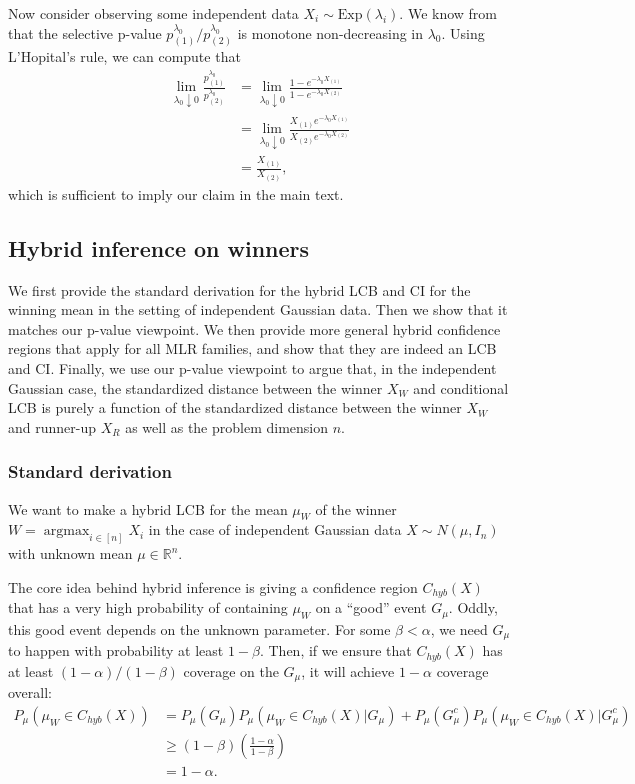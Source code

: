 \documentclass{article}
\DeclareMathOperator*{\argmax}{argmax}
\newcommand{\R}{\mathbb{R}}
\begin{document}
\begin{appendix}
Now consider observing some independent data $X_i \sim \text{Exp}(\lambda_i)$. We know from  that the selective p-value $p^{\lambda_0}_{(1)}/p^{\lambda_0}_{(2)}$ is monotone non-decreasing in $\lambda_0$. Using L'Hopital's rule, we can compute that 
\begin{align*}
    \lim_{\lambda_0 \downarrow 0} \frac{p^{\lambda_0}_{(1)}}{p^{\lambda_0}_{(2)}} &=  \lim_{\lambda_0 \downarrow 0}  \frac{1 - e^{-\lambda_0 X_{(1)}} }{1 - e^{-\lambda_0 X_{(2)}}}\\
    &= \lim_{\lambda_0 \downarrow 0} \frac{X_{(1)}e^{-\lambda_0 X_{(1)}}}{X_{(2)}e^{-\lambda_0 X_{(2)}}}\\
    &= \frac{X_{(1)}}{X_{(2)}},
\end{align*}
which is sufficient to imply our claim in the main text.  

\subsection{Hybrid inference on winners}
\label{sec:hybrid_appdx}

We first provide the standard derivation for the hybrid LCB and CI for the winning mean in the setting of independent Gaussian data. Then we show that it matches our p-value viewpoint. We then provide more general hybrid confidence regions that apply for all MLR families, and show that they are indeed an LCB and CI. Finally, we use our p-value viewpoint to argue that, in the independent Gaussian case, the standardized distance between the winner $X_W$ and conditional LCB is purely a function of the standardized distance between the winner $X_W$ and runner-up $X_R$ as well as the problem dimension $n$. 

\subsubsection{Standard derivation}

We want to make a hybrid LCB for the mean $\mu_{W}$ of the winner $W = \argmax_{i \in [n]} X_i$ in the case of independent Gaussian data $X \sim N(\mu, I_n)$ with unknown mean $\mu \in \R^n$. 

The core idea behind hybrid inference is giving a confidence region $C_{hyb}(X)$ that has a very high probability of containing $\mu_W$ on a ``good'' event $G_{\mu}$. Oddly, this good event depends on the unknown parameter. For some $\beta < \alpha$, we need $G_{\mu}$ to happen with probability at least $1-\beta$. Then, if we ensure that $C_{hyb}(X)$ has at least $(1-\alpha)/(1-\beta)$ coverage on the $G_{\mu}$, it will achieve $1-\alpha$ coverage overall:
\begin{align*}
       P_{\mu}(\mu_{W} \in C_{hyb}(X)) &= P_{\mu}(G_{\mu})P_{\mu}(\mu_{W} \in C_{hyb}(X) | G_{\mu}) + P_{\mu}(G_{\mu}^c)P_{\mu}(\mu_{W} \in C_{hyb}(X) | G_{\mu}^c)\\
       &\geq (1-\beta)\left(\frac{1-\alpha}{1-\beta} \right)\\
       &=1-\alpha.
\end{align*}


\end{appendix}
\end{document}
